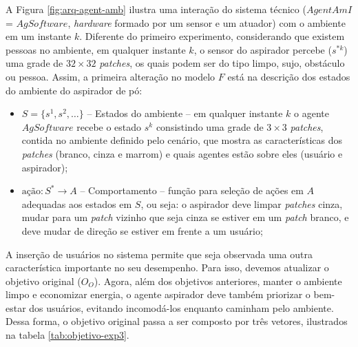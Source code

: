 A Figura \ref{fig:arq-agent-amb} ilustra uma interação do sistema técnico ($AgentAmI$ = $AgSoftware$, \textit{hardware} formado por um sensor e um atuador) com o ambiente em um instante $k$. Diferente do primeiro experimento, considerando que existem pessoas no ambiente, em qualquer instante $k$, o sensor do aspirador percebe ($s^{*k}$) uma grade de $32 \times 32$ \textit{patches}, os quais podem ser do tipo limpo, sujo, obstáculo ou pessoa. Assim, a primeira alteração no modelo $F$ está na descrição dos estados do ambiente do aspirador de pó:

\begin{itemize}
    \item $S = \{s^1, s^2, \ldots\}$ --	Estados do ambiente – em qualquer instante $k$ o agente $AgSoftware$ recebe o estado $s^k$ consistindo uma grade de $3\times3$ \textit{patches}, contida no ambiente definido pelo cenário, que mostra as características dos \textit{patches} (branco, cinza e marrom) e quais agentes estão sobre eles (usuário e aspirador);
    
    \item $\textrm{ação} : S^*  \rightarrow A$ -- Comportamento – função para seleção de ações em $A$ adequadas aos estados em $S$, ou seja: o aspirador deve limpar \textit{patches} cinza, mudar para um \textit{patch} vizinho que seja cinza se estiver em um \textit{patch} branco, e deve mudar de direção se estiver em frente a um usuário;
    
\end{itemize}

A inserção de usuários no sistema permite que seja observada uma outra característica importante no seu desempenho. Para isso, devemos atualizar o objetivo original ($O_O$). Agora, além dos objetivos anteriores, manter o ambiente limpo e economizar energia, o agente aspirador deve também priorizar o bem-estar dos usuários, evitando incomodá-los enquanto caminham pelo ambiente. Dessa forma, o objetivo original passa a ser composto por três vetores, ilustrados na tabela \ref{tab:objetivo-exp3}.

\begin{table}[h!]   
    \centering
\end{table}

